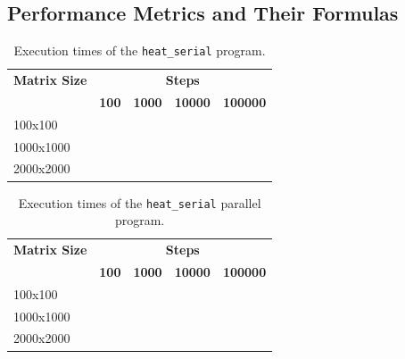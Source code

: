 \documentclass[12pt]{article}
\begin{document}
\subsection{Performance Metrics and Their Formulas}

\begin{table}[h!]
	\centering
	\begin{tabular}{lcccc}
	\hline
	\textbf{Matrix Size} & \multicolumn{4}{c}{\textbf{Steps}} \\
	\cline{2-5}
	 & \textbf{100} & \textbf{1000} & \textbf{10000} & \textbf{100000} \\
	\hline
	100x100 &  &  &  &  \\
	1000x1000 &  &  &  &  \\
	2000x2000 &  &  &  &  \\
	\hline
	\end{tabular}
	\caption{Execution times of the \texttt{heat\_serial} program.}
	\label{tab:serial_times}
	\end{table}

	\begin{table}[h!]
		\centering
		\begin{tabular}{lcccc}
		\hline
		\textbf{Matrix Size} & \multicolumn{4}{c}{\textbf{Steps}} \\
		\cline{2-5}
		 & \textbf{100} & \textbf{1000} & \textbf{10000} & \textbf{100000} \\
		\hline
		100x100 &  &  &  &  \\
		1000x1000 &  &  &  &  \\
		2000x2000 &  &  &  &  \\
		\hline
		\end{tabular}
		\caption{Execution times of the \texttt{heat\_serial} parallel program.}
		\label{tab:omp_times}
		\end{table}
\end{document}
